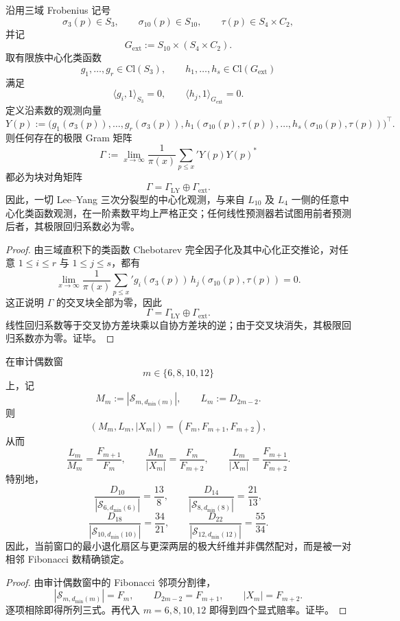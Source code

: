 \begin{theorem}\label{thm:conclusion-leyang-external-block-diagonal-orthogonality}
沿用三域 Frobenius 记号
\[
\sigma_3(p)\in S_3,
\qquad
\sigma_{10}(p)\in S_{10},
\qquad
\tau(p)\in S_4\times C_2,
\]
并记
\[
G_{\mathrm{ext}}:=S_{10}\times (S_4\times C_2).
\]
取有限族中心化类函数
\[
g_1,\dots,g_r\in \mathrm{Cl}(S_3),
\qquad
h_1,\dots,h_s\in \mathrm{Cl}(G_{\mathrm{ext}})
\]
满足
\[
\langle g_i,1\rangle_{S_3}=0,
\qquad
\langle h_j,1\rangle_{G_{\mathrm{ext}}}=0.
\]
定义沿素数的观测向量
\[
Y(p):=
\bigl(g_1(\sigma_3(p)),\dots,g_r(\sigma_3(p)),
h_1(\sigma_{10}(p),\tau(p)),\dots,h_s(\sigma_{10}(p),\tau(p))\bigr)^\top.
\]
则任何存在的极限 Gram 矩阵
\[
\Gamma:=
\lim_{x\to\infty}\frac1{\pi(x)}\sum_{p\le x}'Y(p)Y(p)^\ast
\]
都必为块对角矩阵
\[
\Gamma=\Gamma_{\mathrm{LY}}\oplus \Gamma_{\mathrm{ext}}.
\]
因此，一切 Lee--Yang 三次分裂型的中心化观测，与来自 \(L_{10}\) 及 \(L_4\) 一侧的任意中心化类函数观测，在一阶素数平均上严格正交；任何线性预测器若试图用前者预测后者，其极限回归系数必为零。
\end{theorem}
\begin{proof}
由三域直积下的类函数 Chebotarev 完全因子化及其中心化正交推论，对任意 \(1\le i\le r\) 与 \(1\le j\le s\)，都有
\[
\lim_{x\to\infty}\frac1{\pi(x)}\sum_{p\le x}'
g_i(\sigma_3(p))\,h_j(\sigma_{10}(p),\tau(p))=0.
\]
这正说明 \(\Gamma\) 的交叉块全部为零，因此
\[
\Gamma=\Gamma_{\mathrm{LY}}\oplus \Gamma_{\mathrm{ext}}.
\]
线性回归系数等于交叉协方差块乘以自协方差块的逆；由于交叉块消失，其极限回归系数亦为零。证毕。
\end{proof}

\begin{theorem}[审计偶数窗中的黄金邻项赔率律]\label{thm:conclusion-audited-even-window-fibonacci-adjacent-odds}
在审计偶数窗
\[
m\in\{6,8,10,12\}
\]
上，记
\[
M_m:=|\mathcal S_{m,d_{\min}(m)}|,
\qquad
L_m:=D_{2m-2}.
\]
则
\[
(M_m,L_m,|X_m|)=(F_m,F_{m+1},F_{m+2}),
\]
从而
\[
\frac{L_m}{M_m}=\frac{F_{m+1}}{F_m},
\qquad
\frac{M_m}{|X_m|}=\frac{F_m}{F_{m+2}},
\qquad
\frac{L_m}{|X_m|}=\frac{F_{m+1}}{F_{m+2}}.
\]
特别地，
\[
\frac{D_{10}}{|\mathcal S_{6,d_{\min}(6)}|}=\frac{13}{8},
\qquad
\frac{D_{14}}{|\mathcal S_{8,d_{\min}(8)}|}=\frac{21}{13},
\]
\[
\frac{D_{18}}{|\mathcal S_{10,d_{\min}(10)}|}=\frac{34}{21},
\qquad
\frac{D_{22}}{|\mathcal S_{12,d_{\min}(12)}|}=\frac{55}{34}.
\]
因此，当前窗口的最小退化扇区与更深两层的极大纤维并非偶然配对，而是被一对相邻 Fibonacci 数精确锁定。
\end{theorem}
\begin{proof}
由审计偶数窗中的 Fibonacci 邻项分割律，
\[
|\mathcal S_{m,d_{\min}(m)}|=F_m,
\qquad
D_{2m-2}=F_{m+1},
\qquad
|X_m|=F_{m+2}.
\]
逐项相除即得所列三式。再代入 \(m=6,8,10,12\) 即得到四个显式赔率。证毕。
\end{proof}

